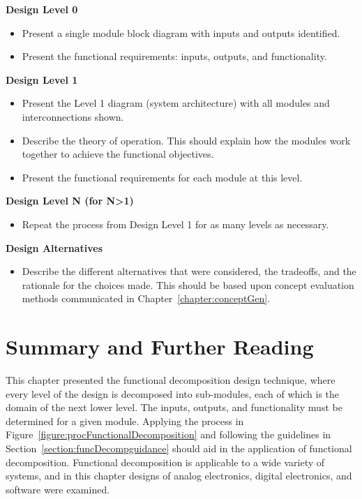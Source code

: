 \textbf{Design Level 0}
\begin{itemize}
\item  Present a single module block diagram with inputs and outputs
  identified.
\item  Present the functional requirements: inputs, outputs, and
  functionality.
\end{itemize}


\textbf{Design Level 1}
\begin{itemize}
\item
  Present the Level 1 diagram (system architecture) with all modules and
  interconnections shown.
\item
  Describe the theory of operation. This should explain how the modules
  work together to achieve the functional objectives.
\item
  Present the functional requirements for each module at this level.
\end{itemize}


\textbf{Design Level N (for N\textgreater1)}
\begin{itemize}
\item
  Repeat the process from Design Level 1 for as many levels as
  necessary.
\end{itemize}

\textbf{Design Alternatives}
\begin{itemize}
\item
  Describe the different alternatives that were considered, the
  tradeoffs, and the rationale for the choices made. This should be
  based upon concept evaluation methods communicated in 
  Chapter~\ref{chapter:conceptGen}.
\end{itemize}

\section{Summary and Further Reading}
\label{section:funcDecomSummary-and-further-reading}

This chapter presented the functional decomposition design technique,
where every level of the design is decomposed into sub-modules, each of
which is the domain of the next lower level. The inputs, outputs, and
functionality must be determined for a given module. Applying the
process in Figure~\ref{figure:procFunctionalDecomposition}
and following the guidelines in Section~\ref{section:funcDecompguidance} should
aid in the application of functional decomposition. Functional
decomposition is applicable to a wide variety of systems, and in this
chapter designs of analog electronics, digital electronics, and software
were examined.

